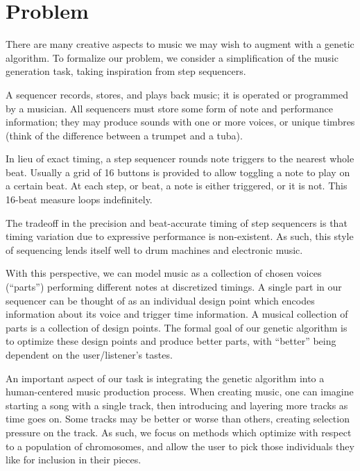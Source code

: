 \documentclass[conference]{IEEEtran}
\begin{document}
\section{Problem}
There are many creative aspects to music we may wish to augment with a genetic
algorithm. To formalize our problem, we consider a simplification of the music
generation task, taking inspiration from step sequencers.\footnotemark
{}

A sequencer \cite{sequencers} records, stores, and plays back music; it is
operated or programmed by a musician. All sequencers must store some form of
note and performance information; they may produce sounds with one or more
voices, or unique timbres (think of the difference between a trumpet and a
tuba).

In lieu of exact timing, a step sequencer rounds note triggers to the nearest
whole beat. Usually a grid of 16 buttons is provided to allow toggling a note
to play on a certain beat. At each step, or beat, a note is either triggered,
or it is not. This 16-beat measure loops indefinitely.

The tradeoff in the precision and beat-accurate timing of step sequencers is
that timing variation due to expressive performance is non-existent. As such,
this style of sequencing lends itself well to drum machines and electronic
music.

With this perspective, we can model music as a collection of chosen voices
(``parts'') performing different notes at discretized timings. A single part in
our sequencer can be thought of as an individual design point which encodes
information about its voice and trigger time information. A musical collection
of parts is a collection of design points. The formal goal of our genetic
algorithm is to optimize these design points and produce better parts, with
``better'' being dependent on the user/listener's tastes.

An important aspect of our task is integrating the genetic algorithm into a
human-centered music production process. When creating music, one can imagine
starting a song with a single track, then introducing and layering more tracks
as time goes on. Some tracks may be better or worse than others, creating
selection pressure on the track. As such, we focus on methods which optimize
with respect to a population of chromosomes, and allow the user to pick those
individuals they like for inclusion in their pieces.
\end{document}
